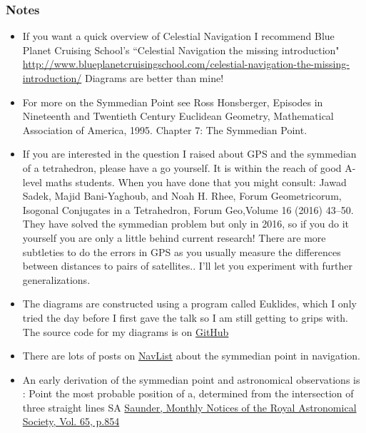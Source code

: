 \documentclass{beamer}
\begin{document}
\begin{frame}\frametitle{Notes}
\tiny
\begin{itemize}
\item If you want a quick overview of Celestial Navigation I recommend Blue Planet Cruising School's ``Celestial Navigation the missing introduction" \url{http://www.blueplanetcruisingschool.com/celestial-navigation-the-missing-introduction/} Diagrams are better than mine!
\item For more on the Symmedian Point see Ross Honsberger, Episodes in Nineteenth and Twentieth Century Euclidean Geometry, Mathematical Association of America, 1995. Chapter 7: The Symmedian Point. 
\item If you are interested in the question I raised about GPS and the symmedian of a tetrahedron, please have a go yourself. It is within the reach of good A-level maths students. When you have done that you might consult: Jawad Sadek, Majid Bani-Yaghoub, and Noah H. Rhee, Forum Geometricorum, Isogonal Conjugates in a Tetrahedron,
Forum Geo,Volume 16 (2016) 43–50. They have solved the symmedian problem but only in 2016, so if you do it yourself you are only a little behind current research! There are more subtleties to do the errors in GPS as you usually measure the differences between distances to pairs of satellites.. I'll let you experiment with further generalizations.
\item The diagrams are constructed using a program called Euklides, which I only tried the day before I first gave the talk so I am still getting to grips with. The source code for my diagrams is on \href{https://github.com/billlion/symmedian-talk}{GitHub}
\item There are lots of posts on \href{http://fer3.com/arc/m2.aspx/Finding-Symmedian-PeterFogg-dec-2010-g15003}{NavList} about the symmedian point in navigation.
\item An early derivation of the symmedian point and astronomical observations is : Point the most probable position of a, determined from the intersection of three straight lines SA \href{http://adsabs.harvard.edu/full/1905MNRAS..65..854S}{Saunder,  Monthly Notices of the Royal Astronomical Society, Vol. 65, p.854}

\end{itemize}
\end{frame}
\end{document}
